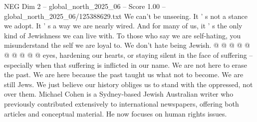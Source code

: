 \begin{textsample}{NEG Dim 2 – global\_north\_2025\_06 – Score 1.00 – global\_north\_2025\_06/125388629.txt}
We can't be unseeing.
It ' s not a stance we adopt.
It ' s a way we are nearly wired.
And for many of us, it ' s the only kind of Jewishness we can live with.
To those who say we are self-hating, you misunderstand the self we are loyal to.
We don't hate being Jewish. @ @ @ @ @ @ @ @ @ @ eyes, hardening our hearts, or staying silent in the face of suffering -- especially when that suffering is inflicted in our name.
We are not here to erase the past.
We are here because the past taught us what not to become.
We are still Jews.
We just believe our history obliges us to stand with the oppressed, not over them.
Michael Cohen is a Sydney-based Jewish Australian writer who previously contributed extensively to international newspapers, offering both articles and conceptual material.
He now focuses on human rights issues.

\end{textsample}
